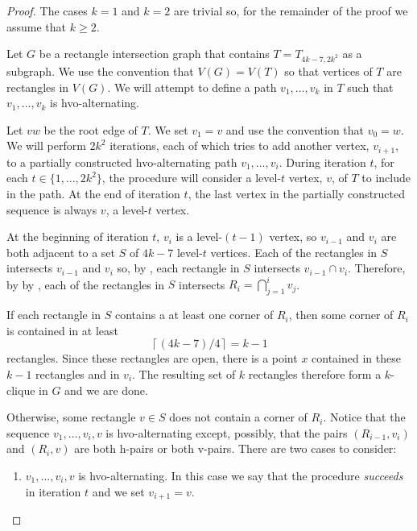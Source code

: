 \documentclass[lotsofwhite]{patmorin}
\newcommand{\iters}{2k^2}
\begin{document}
\begin{proof}
  The cases $k=1$ and $k=2$ are trivial so, for the remainder of the proof
  we assume that $k\ge 2$.

  Let $G$ be a rectangle intersection graph that contains
  $T=T_{4k-7,\iters}$ as a subgraph.  We use the convention that
  $V(G)=V(T)$ so that vertices of $T$ are rectangles in $V(G)$.  
  We will attempt to define a path $v_1,\ldots,v_k$ in $T$ such that
  $v_1,\ldots,v_k$ is hvo-alternating. 

  Let $vw$ be the root edge of $T$. We set $v_1=v$ and use the convention
  that $v_0=w$.  We will perform $\iters$ iterations, each of which
  tries to add another vertex, $v_{i+1}$, to a partially constructed
  hvo-alternating path $v_1,\ldots,v_i$. During iteration $t$, for
  each $t\in\{1,\ldots,\iters\}$, the procedure will consider a
  level-$t$ vertex, $v$, of $T$ to include in the path.  At the end of
  iteration $t$, the last vertex in the partially constructed sequence
  is always $v$, a level-$t$ vertex.

  At the beginning of iteration $t$, $v_i$ is a level-$(t-1)$ vertex, so
  $v_{i-1}$ and $v_i$ are both adjacent to a set $S$ of $4k-7$ level-$t$
  vertices.  Each of the rectangles in $S$ intersects $v_{i-1}$ and
  $v_i$ so, by , each rectangle in $S$ intersects
  $v_{i-1}\cap v_i$.  Therefore, by by , each of
  the rectangles in $S$ intersects $R_i=\bigcap_{j=1}^i v_j$.

  If each rectangle in $S$ contains a
  at least one corner of $R_i$, then some corner of $R_i$ is contained 
  in at least
  \[
         \left\lceil(4k-7)/4\right\rceil = k-1
  \]
  rectangles.  Since these rectangles are open, there is a point $x$
  contained in these $k-1$ rectangles and in $v_{i}$.  The resulting set
  of $k$ rectangles therefore form a $k$-clique in $G$ and we are done.

  Otherwise, some rectangle $v\in S$ does not contain a corner of $R_i$.
  Notice that the sequence $v_1,\ldots,v_i,v$ is hvo-alternating except,
  possibly, that the pairs $(R_{i-1},v_i)$ and $(R_i,v)$ are both h-pairs
  or both v-pairs.  There are two cases to consider:
  \begin{enumerate}
     \item $v_1,\ldots,v_i,v$ is hvo-alternating. In this
       case we say that the procedure \emph{succeeds} in iteration $t$
       and we set $v_{i+1}=v$.


\end{enumerate}
\end{proof}
\end{document}
